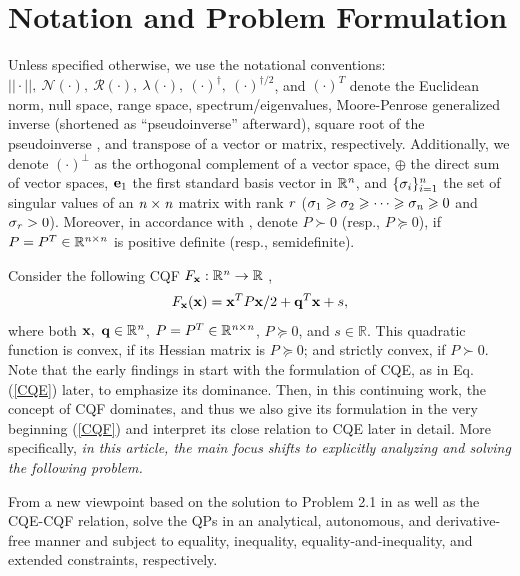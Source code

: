 \documentclass{imaman}
\newcommand{\beq}{\begin{eqnarray}}
\newcommand{\eeq}{\end{eqnarray}}
\newcommand{\bfx}{{\bf x}}
\newcommand{\bfq}{{\bf q}}
\newcommand{\bfe}{{\bf e}}
\newcommand{\real}{\mathbb{R}}
\newcommand{\calN}{{\mathcal N}}
\newcommand{\calR}{{\mathcal R}}
\newcommand{\itn}{{\it n}}
\newcommand{\itr}{{\it r}}
\numberwithin{equation}{section}
\begin{document}
\section{Notation and Problem Formulation}
\label{Sec_Notation_Problem}
Unless specified otherwise, we use the notational conventions: $||\cdot||,~\calN(\cdot),~\calR(\cdot),~\lambda(\cdot),~(\cdot)^\dagger,~(\cdot)^{\dagger/2}$, and $(\cdot)^T$ denote the Euclidean norm, null space, range space, spectrum/eigenvalues, Moore-Penrose generalized inverse (shortened as ``pseudoinverse'' afterward), square root of the pseudoinverse \citep{UrBlDr:13}, and transpose of a vector or matrix, respectively. Additionally, we denote $(\cdot)^\perp$ as the orthogonal complement of a vector space, $\oplus$ the direct sum of vector spaces, $\bfe_1$ the first standard basis vector in $\real^\itn$, and $\{\sigma_i\}_{i=1}^\itn$ the set of singular values of an $\itn\times\itn$ matrix with rank $\itr$ ($\sigma_1\ge\sigma_2\ge\cdots\ge\sigma_\itn\ge 0$ and $\sigma_\itr>0$). Moreover, in accordance with \cite{Lu(Ye):03(16)}, denote $P\succ 0$ (resp., $P\succeq 0$), if $P=P^T\in\real^{{\it n}\times {\it n}}$ is positive definite (resp., semidefinite).

Consider the following CQF $F_\bfx: \real^\itn\rightarrow\real$ \citep{Lu(Ye):03(16)},
\beq
F_\bfx(\bfx)=\bfx^TP\bfx/2+\bfq^T\bfx+s,
\label{CQF}
\eeq
where both $\bfx,~\bfq\in\real^{\it n}$, $P=P^T\in\real^{{\it n}\times {\it n}}$, $P\succeq 0$, and $s\in\real$. This quadratic function is convex, if its Hessian matrix is $P\succeq 0$; and strictly convex, if $P\succ 0$. Note that the early findings in \cite{LiLiHs:20} start with the formulation of CQE, as in Eq. (\ref{CQE}) later, to emphasize its dominance. Then, in this continuing work, the concept of CQF dominates, and thus we also give its formulation in the very beginning (\ref{CQF}) and interpret its close relation to CQE later in detail. More specifically, \textit{in this article, the main focus shifts to explicitly analyzing and solving the following problem.}

\begin{problem}
From a new viewpoint based on the solution to Problem 2.1 in \cite{LiLiHs:20} as well as the CQE-CQF relation, solve the QPs in an analytical, autonomous, and derivative-free manner and subject to equality, inequality, equality-and-inequality, and extended constraints, respectively.
\label{Prob_Convex_Optimization}
\end{problem}
\end{document}
